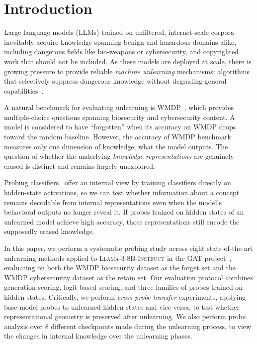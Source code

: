 \section{Introduction}
\label{sec:intro}

Large language models (LLMs) trained on unfiltered, internet-scale corpora inevitably acquire knowledge spanning benign and hazardous domains alike, including dangerous fields like bio-weapons or cybersecurity, and copyrighted work that should not be included.
As these models are deployed at scale, there is growing pressure to provide reliable
\emph{machine unlearning} mechanisms: algorithms that selectively suppress dangerous knowledge without degrading general capabilities~\citep{dorna2025openunlearning}.

A natural benchmark for evaluating unlearning is WMDP~\citep{li2024wmdp}, which
provides multiple-choice questions spanning biosecurity and cybersecurity content.
A model is considered to have ``forgotten'' when its accuracy on WMDP drops toward the random baseline.
However, the accuracy of WMDP benchmark measures only one dimension of knowledge, what the model outputs.
The question of whether the underlying \emph{knowledge representations} are genuinely erased is distinct and remains largely unexplored.

Probing classifiers~\citep{gekhman2025insideout} offer an internal view by training classifiers directly on hidden-state activations, so we can test whether information about a concept remains decodable from internal representations even when the model's behavioral outputs no longer reveal it. If probes trained on hidden states of an unlearned model achieve high accuracy, those representations still encode the supposedly erased knowledge.

In this paper, we perform a systematic probing study across eight state-of-the-art unlearning methods applied to \textsc{Llama-3-8B-Instruct} in the GAT project~\citep{che2025model}, evaluating on both the WMDP biosecurity dataset as the forget set and the WMDP cybersecurity dataset as the retain set.
Our evaluation protocol combines generation scoring, logit-based scoring, and three families of probes trained on hidden states.
Critically, we perform \emph{cross-probe transfer} experiments, applying base-model probes to unlearned hidden states and vice versa, to test whether representational geometry is preserved after unlearning.
We also perform probe analysis over 8 different checkpoints made during the unlearning process, to view the changes in internal knowledge over the unlearning phases.

